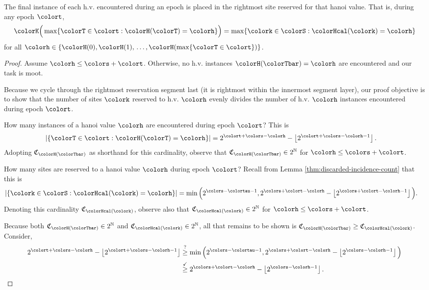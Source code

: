 \begin{lemma}
\label{lemma:tilted-last-touched}
The final instance of each h.v. encountered during an epoch is placed in the rightmost site reserved for that hanoi value.
That is, during any epoch $\colort$,
\begin{align*}
\colorK\Big(
  \max\{\colorT \in \colort : \colorH(\colorT) = \colorh\}
\Big)
=
\max\{\colork \in \colorS : \colorHcal(\colork) = \colorh \}
\end{align*}
for all $\colorh \in \{\colorH(0), \colorH(1), \,\ldots, \colorH(\max\{\colorT \in \colort\})\}$.
\end{lemma}

\begin{proof}
Assume $\colorh \leq \colors + \colort$.
Otherwise, no h.v. instances $\colorH(\colorTbar) = \colorh$ are encountered and our task is moot.

Because we cycle through the rightmost reservation segment last (it is rightmost within the innermost segment layer), our proof objective is to show that the number of sites $\colork$ reserved to h.v. $\colorh$ evenly divides the number of h.v. $\colorh$ instances encountered during epoch $\colort$.

How many instances of a hanoi value $\colorh$ are encountered during epoch $\colort$?
This is
\begin{align*}
|\{\colorT \in \colort : \colorH(\colorT) = \colorh\}|
&=
2^{\colort + \colors - \colorh} - \left\lfloor2^{\colort + \colors - \colorh - 1} \right\rfloor.
\end{align*}
Adopting $\mathfrak{C}_{\colorH(\colorTbar)}$ as shorthand for this cardinality, observe that $\mathfrak{C}_{\colorH(\colorTbar)} \in 2^{\mathbb{N}}$ for $\colorh \leq \colors + \colort$.

How many sites are reserved to a hanoi value $\colorh$ during epoch $\colort$?
Recall from Lemma \ref{thm:discarded-incidence-count} that this is
\begin{align*}
|\{\colork \in \colorS : \colorHcal(\colork) = \colorh\}|
&=
\min\Big(
2^{\colors - \colortau - 1},
2^{\colors + \colort - \colorh} - \left\lfloor 2^{\colors + \colort - \colorh - 1} \right\rfloor
\Big).
\end{align*}
Denoting this cardinality $\mathfrak{C}_{\colorHcal(\colork)}$, observe also that
$\mathfrak{C}_{\colorHcal(\colork)} \in 2^{\mathbb{N}}$ for $\colorh \leq \colors + \colort$.

Because both $\mathfrak{C}_{\colorH(\colorTbar)} \in 2^{\mathbb{N}}$ and $\mathfrak{C}_{\colorHcal(\colork)} \in 2^{\mathbb{N}}$, all that remains to be shown is $\mathfrak{C}_{\colorH(\colorTbar)} \geq \mathfrak{C}_{\colorHcal(\colork)}$.
Consider,
\begin{align*}
2^{\colort + \colors - \colorh} - \left\lfloor2^{\colort + \colors - \colorh - 1} \right\rfloor
&\stackrel{?}{\geq}
\min\Big(
2^{\colors - \colortau - 1},
2^{\colors + \colort - \colorh} - \left\lfloor 2^{\colors - \colorh - 1} \right\rfloor
\Big)\\
&\stackrel{\checkmark}{\geq}
2^{\colors + \colort - \colorh} - \left\lfloor 2^{\colors - \colorh - 1} \right\rfloor.
\end{align*}
\end{proof}
